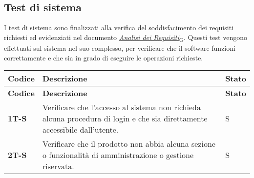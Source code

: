 \newpage
\subsection{Test di sistema}
I test di sistema sono finalizzati alla verifica del soddisfacimento dei requisiti richiesti ed evidenziati nel documento \href{https://7last.github.io/docs/rtb/documentazione-esterna/analisi-dei-requisiti}{\href{https://7last.github.io/docs/pb/documentazione-interna/glossario\#analisi-dei-requisiti}{\textit{Analisi dei Requisiti}\textsubscript{G}}}. Questi test vengono effettuati sul sistema nel suo complesso, per verificare che il software funzioni correttamente e che sia in grado di eseguire le operazioni richieste. \\
\begin{longtable}{|>{\raggedright\arraybackslash}m{}|>{\raggedright\arraybackslash}m{}|>{\raggedright\arraybackslash}m{}|}
	\hline
	\textbf{Codice} & \textbf{Descrizione}                                                                                                                                                                                                                                                                                                                                                                                     & \textbf{Stato} \\
	\hline
	\endfirsthead
	\hline
	\textbf{Codice} & \textbf{Descrizione}                                                                                                                                                                                                                                                                                                                                                                                     & \textbf{Stato} \\
	\endhead
	\textbf{1T-S}   & Verificare che l'accesso al sistema non richieda alcuna procedura di login e che sia direttamente accessibile dall'utente.                                                                                                                                                                                                                                                                               & S              \\
	\hline
	\textbf{2T-S}   & Verificare che il prodotto non abbia alcuna sezione o funzionalità di amministrazione o gestione riservata.                                                                                                                                                                                                                                                                                              & S              \\

\end{longtable}

